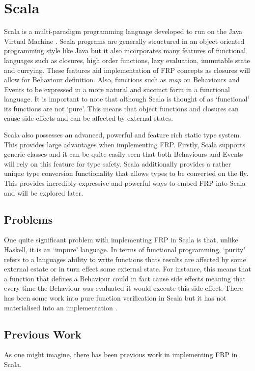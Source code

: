 \chapter{Scala}
  Scala is a multi-paradigm programming language developed to run on the Java Virtual Machine \cite{Odersky2004}. Scala 
  programs are
  generally structured in an object oriented programming style like Java but it also incorporates many features of
  functional languages such as closures, high order functions, lazy evaluation, immutable state and currying. These features aid
  implementation of FRP concepts as closures will allow for Behaviour definition. Also, functions such as \emph{map} on
  Behaviours and Events to be expressed in a more natural and succinct form in a functional language. It is
  important to note that although Scala is thought of as `functional' its functions are not `pure'. This means
  that object functions and closures can cause side effects and can be affected by external states.

  Scala also possesses an advanced, powerful and feature rich static type system. This provides large
  advantages when implementing FRP. Firstly, Scala supports generic classes and it can be quite easily seen
  that both Behaviours and Events will rely on this feature for type safety. Scala additionally provides
  a rather unique type conversion functionality that allows types to be converted on the fly. This provides
  incredibly expressive and powerful ways to embed FRP into Scala and will be explored later.
  
  \section{Problems}
    One quite significant problem with implementing FRP in Scala is that, unlike Haskell, it is an `impure'
    language. In terms of functional programming, `purity' refers to a languages ability to write functions
    thats results are affected by some external estate or in turn effect some external state. For instance,
    this means that a function that defines a Behaviour could in fact cause side effects meaning that
    every time the Behaviour was evaluated it would execute this side effect. There has been some work into
    pure function verification in Scala but it has not materialised into an implementation \cite{Nordenberg}. 
  
  \section{Previous Work}
    As one might imagine, there has been previous work in implementing FRP in Scala. 
    
